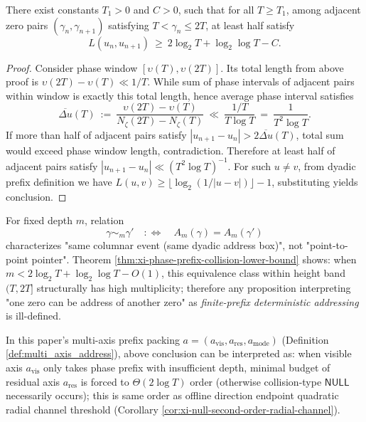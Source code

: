\begin{proposition}\label{prop:xi-phase-adjacent-prefix-sharing}
There exist constants \(T_1>0\) and \(C>0\), such that for all \(T\ge T_1\), among adjacent zero pairs \((\gamma_n,\gamma_{n+1})\) satisfying \(T<\gamma_n\le 2T\), at least half satisfy
\[
L(u_n,u_{n+1})\ \ge\ 2\log_2 T+\log_2\log T - C.
\]
\end{proposition}

\begin{proof}
Consider phase window \([\upsilon(T),\upsilon(2T)]\).
Its total length from above proof is \(\upsilon(2T)-\upsilon(T)\ll 1/T\).
While sum of phase intervals of adjacent pairs within window is exactly this total length, hence average phase interval satisfies
\[
\overline{\Delta u}(T)\ :=\ \frac{\upsilon(2T)-\upsilon(T)}{N_\zeta(2T)-N_\zeta(T)}\ \ll\ \frac{1/T}{T\log T}\ =\ \frac{1}{T^2\log T}.
\]
If more than half of adjacent pairs satisfy \(|u_{n+1}-u_n|>2\overline{\Delta u}(T)\), total sum would exceed phase window length, contradiction.
Therefore at least half of adjacent pairs satisfy \(|u_{n+1}-u_n|\ll (T^2\log T)^{-1}\).
For such \(u\neq v\), from dyadic prefix definition we have \(L(u,v)\ge \lfloor \log_2(1/|u-v|)\rfloor -1\), substituting yields conclusion.
\end{proof}

\begin{remark}\label{rem:xi-phase-prefix-not-pointer}
For fixed depth \(m\), relation
\[
\gamma\sim_m\gamma'\quad:\Longleftrightarrow\quad A_m(\gamma)=A_m(\gamma')
\]
characterizes "same columnar event (same dyadic address box)", not "point-to-point pointer".
Theorem \ref{thm:xi-phase-prefix-collision-lower-bound} shows: when \(m<2\log_2T+\log_2\log T-O(1)\), this equivalence class within height band \((T,2T]\) structurally has high multiplicity; therefore any proposition interpreting "one zero can be address of another zero" as \emph{finite-prefix deterministic addressing} is ill-defined.
\par
In this paper's multi-axis prefix packing \(a=(a_{\mathrm{vis}},a_{\mathrm{res}},a_{\mathrm{mode}})\) (Definition \ref{def:multi_axis_address}), above conclusion can be interpreted as: when visible axis \(a_{\mathrm{vis}}\) only takes phase prefix with insufficient depth, minimal budget of residual axis \(a_{\mathrm{res}}\) is forced to \(\Theta(2\log T)\) order (otherwise collision-type \(\mathsf{NULL}\) necessarily occurs); this is same order as offline direction endpoint quadratic radial channel threshold (Corollary \ref{cor:xi-null-second-order-radial-channel}).
\end{remark}

